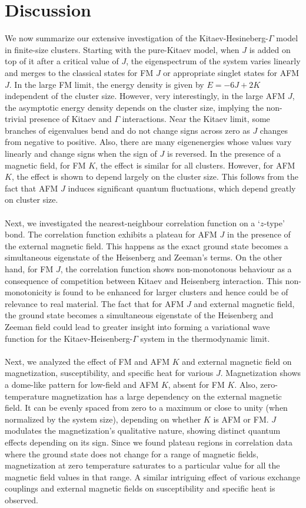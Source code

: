 \documentclass[aps,amsmath,twocolumn,amssymb,floatfix,showpacs,superscriptaddress,nofootinbib,longbibliography]{revtex4-1}
\begin{document}
\section{Discussion}\label{discussion}
We now summarize our extensive investigation of the Kitaev-Hesineberg-$\Gamma$ model in finite-size clusters. Starting with the pure-Kitaev model, when $J$ is added on top of it after a critical value of $J$, the eigenspectrum of the system varies linearly and merges to the classical states for FM $J$ or appropriate singlet states for AFM $J$. In the large FM limit, the energy density is given by $E=-6J+2K$ independent of the cluster size. However, very interestingly, in the large AFM $J$, the asymptotic energy density depends on the cluster size, implying the non-trivial presence of Kitaev and $\Gamma$ interactions. Near the Kitaev limit, some branches of eigenvalues bend and do not change signs across zero as $J$ changes from negative to positive. Also, there are many eigenenergies whose values vary linearly and change signs when the sign of $J$ is reversed. In the presence of a magnetic field, for FM $K$, the effect is similar for all clusters. However, for AFM $K$, the effect is shown to depend largely on the cluster size. This follows from the fact that AFM $J$ induces significant quantum fluctuations, which depend greatly on cluster size.
\\\\\indent
Next, we investigated the nearest-neighbour correlation function on a `$z$-type' bond. The correlation function exhibits a plateau for AFM $J$ in the presence of the external magnetic field. This happens as the exact ground state becomes a simultaneous eigenstate of the Heisenberg and Zeeman's terms. On the other hand, for FM $J$, the correlation function shows non-monotonous behaviour as a consequence of competition between Kitaev and Heisenberg interaction. This non-monotonicity is found to be enhanced for larger clusters and hence could be of relevance to real material. The fact that for AFM $J$ and external magnetic field, the ground state becomes a simultaneous eigenstate of the Heisenberg and Zeeman field could lead to greater insight into forming a variational wave function for the Kitaev-Heisenberg-$\Gamma$ system in the thermodynamic limit.
\\\\\indent
Next, we analyzed the effect of FM and AFM $K$ and external magnetic field on magnetization, susceptibility, and specific heat for various $J$. Magnetization shows a dome-like pattern for low-field and AFM $K$, absent for FM $K$. Also, zero-temperature magnetization has a large dependency on the external magnetic field. It can be evenly spaced from zero to a maximum or close to unity (when normalized by the system size), depending on whether $K$ is AFM or FM. $J$ modulates the magnetization's qualitative nature, showing distinct quantum effects depending on its sign. Since we found plateau regions in correlation data where the ground state does not change for a range of magnetic fields, magnetization at zero temperature saturates to a particular value for all the magnetic field values in that range. A similar intriguing effect of various exchange couplings and external magnetic fields on susceptibility and specific heat is observed.
\end{document}
